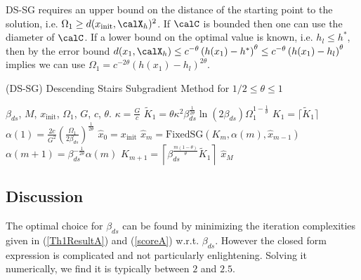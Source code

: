 \documentclass[smallextended]{svjour3}
\begin{document}
  
  
  
  DS-SG requires an upper bound on the distance of the starting point to the solution, i.e. $\Omega_1\geq d(x_{\text{init}},\calX_h)^2$. If $\calC$ is bounded then one can use the diameter of $\calC$. If a lower bound on the optimal value is known, i.e. $h_{l}\leq h^*$, then by the error bound $d(x_1,\calX_h)\leq c^{-\theta}\left(h(x_1)-h^*\right)^\theta\leq c^{-\theta}\left(h(x_1)-h_l\right)^\theta$ implies we can use $\Omega_1=c^{-2\theta}\left(h(x_1)-h_l\right)^{2\theta}$.
 
 \begin{algorithm}
 
   \caption{(DS-SG) Descending Stairs Subgradient Method for $1/2\leq \theta\leq 1$}
   \begin{algorithmic}[1]
   \REQUIRE $\beta_{ds}$, $M$, $x_{\text{init}}$, $\Omega_1$, $G$, $c$, $\theta$.
   \STATE  $\kappa=\frac{G}{c}$ 
   \STATE \label{Kline1} $\tilde{K}_1=
     \theta
 \kappa^2\beta_{ds}^{\frac{1}{2\theta}}\ln\left(2\beta_{ds}\right)
      \Omega_1^{1-\frac{1}{\theta}}
         $
   \STATE $K_1 = \lceil\tilde{K}_1\rceil$
   \STATE\label{alphaline1} $\alpha(1)=\frac{2c}{G^2}\left(\frac{\Omega_1}{2\beta_{ds}}\right)^{\frac{1}{2\theta}}$
   \STATE $\hat{x}_0=x_{\text{init}}$
      \STATE    $\hat{x}_m = \text{FixedSG}(K_m,\alpha(m),\hat{x}_{m-1})$\label{LineXhat}
      \STATE \label{alphaline2} $\alpha(m+1) = \beta_{ds}^{-\frac{1}{2\theta}}\alpha(m)$
      \STATE $K_{m+1}=\left\lceil\beta_{ds}^{\frac{m(1-\theta)}{\theta}}\tilde{K}_1\right\rceil$\label{Kline2}
   \ENDFOR
   \RETURN $\hat{x}_M$ 
   \end{algorithmic}
   \label{ReSG}
\end{algorithm}
 


   
  \subsection{Discussion}\label{Discuss}\label{secDD_discuss}
%  
  
The optimal choice for $\beta_{ds}$ can be found by minimizing the iteration complexities given in (\ref{Th1ResultA}) and (\ref{scoreA})  w.r.t. $\beta_{ds}$. However the closed form expression is complicated and not particularly enlightening. Solving it numerically, we find it is typically between $2$ and $2.5$.
\end{document}
